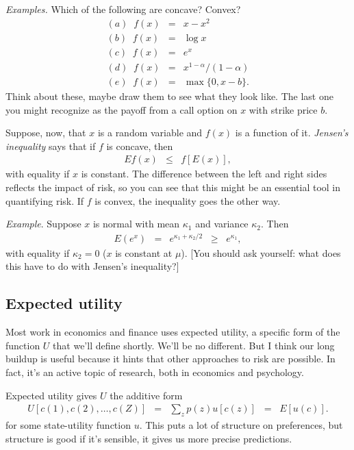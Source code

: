 \documentclass[11pt]{article}
\begin{document}
{\it Examples.\/}
Which of the following are concave?  Convex?
\begin{eqnarray*}
    (a) \;\; f(x) &=& x - x^2 \\
    (b) \;\; f(x) &=& \log x  \\
    (c) \;\; f(x) &=& e^x \\
    (d) \;\; f(x) &=& x^{1-\alpha}/(1-\alpha) \\
    (e) \;\; f(x) &=& \max \{ 0, x-b \} .
\end{eqnarray*}
Think about these, maybe draw them to see what they look like.
The last one you might recognize as the payoff from
a call option on $x$ with strike price $b$.


Suppose, now, that $x$ is a random variable and $f(x)$ is a function
of it.
{\it Jensen's inequality\/} says that if $f$ is concave, then
\begin{eqnarray*}
    E f(x) &\leq& f [E(x)] ,
\end{eqnarray*}
with equality if $x$ is constant.
The difference between the left and right sides reflects
the impact of risk, so you can see that this might be
an essential tool in quantifying risk.
If $f$ is convex, the inequality goes the other way.

{\it Example\/}.
Suppose $x$ is normal with mean $\kappa_1$ and variance $\kappa_2$.
Then
\begin{eqnarray*}
    E \left( e^x \right) &=&  e^{\kappa_1 + \kappa_2/2}
            \;\;\geq\;\; e^{\kappa_1},
\end{eqnarray*}
with equality if $\kappa_2 = 0$ ($x$ is constant at $\mu$).
[You should ask yourself:  what does this have to do with
Jensen's inequality?]


\subsection*{Expected utility}

Most work in economics and finance uses expected utility,
a specific form of the function $U$ that we'll define shortly.
We'll be no different.
But I think our long buildup is useful because it hints
that other approaches to risk are possible.
In fact, it's an active topic of research,
both in economics and psychology.

Expected utility gives $U$ the additive form
\begin{eqnarray}
    U [c(1), c(2), \ldots, c(Z)]
            &=& \sum_z p(z) u[c(z)]  \;\;=\;\;  E [u(c)] .
\end{eqnarray}
for some state-utility function $u$.
This puts a lot of structure on preferences,
but structure is good if it's sensible,
it gives us more precise predictions.
\end{document}
